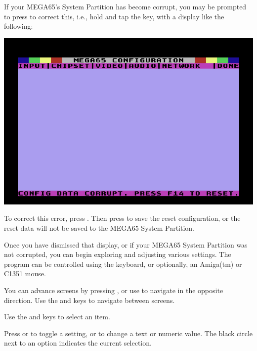 \begin{minipage}{\linewidth}
  If your MEGA65's System Partition has become corrupt, you may be
  prompted to press  to correct this, i.e., hold  and tap
  the  key, with a display like the following:

  \vspace{5mm}
  \includegraphics[width=\linewidth]{images/ss-m65config-corrupt.png}
\end{minipage}

To correct this error, press . Then press  to save the reset configuration, or the reset data will not be saved to the MEGA65 System
Partition.

Once you have dismissed that display, or if your MEGA65 System Partition was not corrupted, you can begin exploring and adjusting various settings. The program can be controlled using the keyboard, or optionally, an Amiga(tm) or C1351 mouse.

You can advance screens by pressing , or use  to navigate in the opposite direction. Use the \megakey{$\leftarrow$} and \megakey{$\rightarrow$} keys to navigate between screens.

Use the \megakey{$\uparrow$} and \megakey{$\downarrow$} keys to select an item.

Press  or  to toggle a setting, or to change a text or numeric value. The black circle next to an option indicates the current selection.


